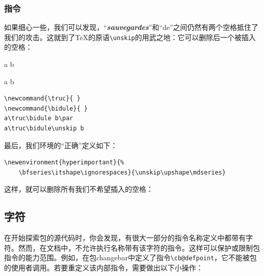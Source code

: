 \subsubsection{指令}

如果细心一些，我们可以发现，“{\bfseries\itshape sauvegardes}”和“de”之间仍然有两个空格抵住了我们的攻击。这就到了\TeX 的原语\verb|\unskip|的用武之地：它可以删除后一个被插入的空格：

\begin{codelist}[9.7]{
    \newcommand{\truc}{ }
\newcommand{\bidule}{ }
a\truc\bidule b\par
a\truc\bidule\unskip b
}\begin{verbatim}
\newcommand{\truc}{ }
\newcommand{\bidule}{ }
a\truc\bidule b\par
a\truc\bidule\unskip b
\end{verbatim}
\end{codelist}

最后，我们环境的“正确”定义如下：

\begin{dmd}
\begin{verbatim}
\newenvironment{hyperimportant}{% 
    \bfseries\itshape\ignorespaces}{\unskip\upshape\mdseries}
\end{verbatim}
\end{dmd}

这样，就可以删除所有我们不希望插入的空格：

\renewenvironment{hyperimportant}{%
    \bfseries\itshape\ignorespaces}{\unskip\upshape\mdseries}


\subsection{字符}

在开始探索包的源代码时，你会发现，有很大一部分的指令名称定义中都带有字符。然而，在文档中，不允许执行名称带有该字符的指令。这样可以保护或限制包指令的能力范围。例如，在包\textsf{changebar}中定义了指令\verb+\cb@defpoint+，它不能被包的使用者调用。若要重定义该内部指令，需要做出以下小操作：

